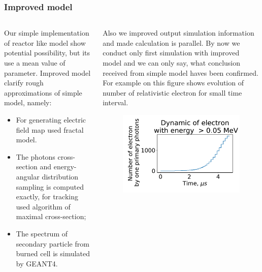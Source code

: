 \documentclass[8pt,pdf,hyperref={unicode}]{beamer}
\begin{document}
\begin{frame}
\frametitle{Improved model}
\begin{columns}
	\begin{column}{0.45\textwidth}
               Our simple implementation of reactor like model show potential possibility, but its use a mean value of parameter. 
Improved model clarify  rough approximations of simple model, namely:
\begin{itemize}
	\item For generating electric field map used fractal model.
	\item The photons cross-section and energy-angular distribution sampling  is computed exactly, for tracking used algorithm of maximal cross-section;
	\item The spectrum of secondary particle from burned cell is simulated by GEANT4.
	
\end{itemize}
	\end{column}
	\begin{column}{0.45\textwidth}
            Also we improved output simulation information and made calculation is parallel.
By now we conduct only first simulation with improved model and we can only say, what conclusion received from simple model  haves been confirmed. For example on this figure shows evolution of  number of relativistic electron for small time interval.
\begin{figure}[htb]
	\centering
	\includegraphics[width=1\columnwidth]{kotlinElectron.pdf}
	
\end{figure}
		
	\end{column}
\end{columns}
\end{frame}
\end{document}
